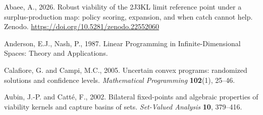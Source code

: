 \documentclass[10pt,twocolumn]{article}
\theoremstyle{plain}
\theoremstyle{definition}
\theoremstyle{remark}
\begin{document}
Abaee, A., 2026. Robust viability of the 2J3KL limit reference point
under a surplus-production map: policy scoring, expansion, and when catch
cannot help. Zenodo. \url{https://doi.org/10.5281/zenodo.22552060}

Anderson, E.J., Nash, P., 1987. Linear Programming in Infinite-Dimensional
Spaces: Theory and Applications.

Calafiore, G. and Campi, M.C., 2005. Uncertain convex programs: randomized solutions and
confidence levels. \emph{Mathematical Programming} \textbf{102}(1), 25--46.


Aubin, J.-P. and Catt\'e, F., 2002. Bilateral fixed-points and algebraic properties of
viability kernels and capture basins of sets. \emph{Set-Valued Analysis} \textbf{10},
379--416.
\end{document}
